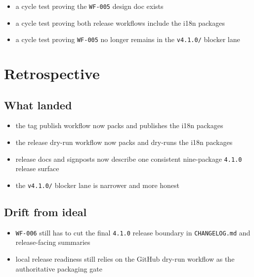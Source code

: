 \begin{itemize}
\tightlist
\item
  a cycle test proving the \texttt{W\allowbreak{}F\allowbreak{}-\allowbreak{}0\allowbreak{}0\allowbreak{}5} design doc exists
\item
  a cycle test proving both release workflows include the i18n packages
\item
  a cycle test proving \texttt{W\allowbreak{}F\allowbreak{}-\allowbreak{}0\allowbreak{}0\allowbreak{}5} no longer remains in the \texttt{v\allowbreak{}4\allowbreak{}.\allowbreak{}1\allowbreak{}.\allowbreak{}0\allowbreak{}/} blocker lane
\end{itemize}

\section{Retrospective}\label{record-203-retrospective}

\subsection{What landed}\label{record-203-what-landed}

\begin{itemize}
\tightlist
\item
  the tag publish workflow now packs and publishes the i18n packages
\item
  the release dry-run workflow now packs and dry-runs the i18n packages
\item
  release docs and signposts now describe one consistent nine-package \texttt{4\allowbreak{}.\allowbreak{}1\allowbreak{}.\allowbreak{}0} release surface
\item
  the \texttt{v\allowbreak{}4\allowbreak{}.\allowbreak{}1\allowbreak{}.\allowbreak{}0\allowbreak{}/} blocker lane is narrower and more honest
\end{itemize}

\subsection{Drift from ideal}\label{record-203-drift-from-ideal}

\begin{itemize}
\tightlist
\item
  \texttt{W\allowbreak{}F\allowbreak{}-\allowbreak{}0\allowbreak{}0\allowbreak{}6} still has to cut the final \texttt{4\allowbreak{}.\allowbreak{}1\allowbreak{}.\allowbreak{}0} release boundary in \texttt{C\allowbreak{}H\allowbreak{}A\allowbreak{}N\allowbreak{}G\allowbreak{}E\allowbreak{}L\allowbreak{}O\allowbreak{}G\allowbreak{}.\allowbreak{}m\allowbreak{}d} and release-facing summaries
\item
  local release readiness still relies on the GitHub dry-run workflow as the authoritative packaging gate
\end{itemize}

